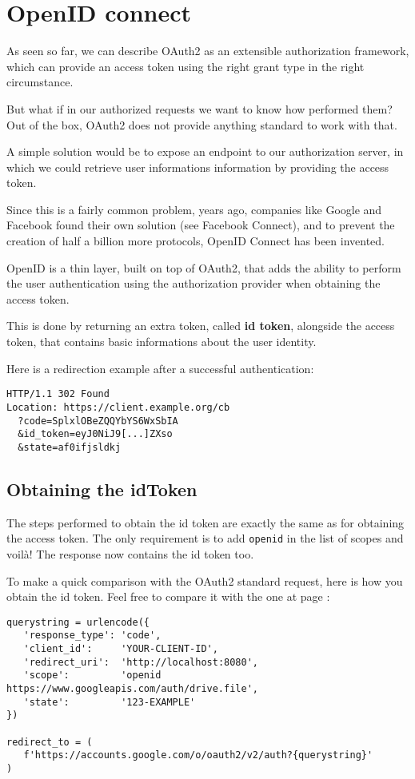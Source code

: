 \section{OpenID connect}
\label{openid}
As seen so far, we can describe OAuth2 as an extensible authorization
framework, which can provide an access token using the right grant type in the
right circumstance.

But what if in our authorized requests we want to know how performed them?
Out of the box, OAuth2 does not provide anything standard to work with that.

A simple solution would be to expose an endpoint to our authorization server,
in which we could retrieve user informations information by providing the
access token.

Since this is a fairly common problem, years ago, companies like Google and
Facebook found their own solution (see Facebook Connect), and to prevent the
creation of half a billion more protocols, OpenID Connect has been invented.

OpenID is a thin layer, built on top of OAuth2, that adds the ability to perform
the user authentication using the authorization provider when obtaining the access token.

This is done by returning an extra token, called \textbf{id token}, alongside
the access token, that contains basic informations about the user identity.

Here is a redirection example after a successful authentication:
\begin{lstlisting}
HTTP/1.1 302 Found
Location: https://client.example.org/cb
  ?code=SplxlOBeZQQYbYS6WxSbIA
  &id_token=eyJ0NiJ9[...]ZXso
  &state=af0ifjsldkj
\end{lstlisting}

\subsection{Obtaining the idToken}
The steps performed to obtain the id token are exactly the same as for obtaining the access token.
The only requirement is to add \texttt{openid} in the list of scopes and voilà! The response now contains the id token too.

To make a quick comparison with the OAuth2 standard request, here is how you obtain the id token. Feel free to compare it with the one at page \pageref{lst:authorization-code}:

\begin{lstlisting}
querystring = urlencode({
   'response_type': 'code',
   'client_id':     'YOUR-CLIENT-ID',
   'redirect_uri':  'http://localhost:8080',
   'scope':         'openid https://www.googleapis.com/auth/drive.file',
   'state':         '123-EXAMPLE'
})

redirect_to = (
   f'https://accounts.google.com/o/oauth2/v2/auth?{querystring}'
)
\end{lstlisting}

